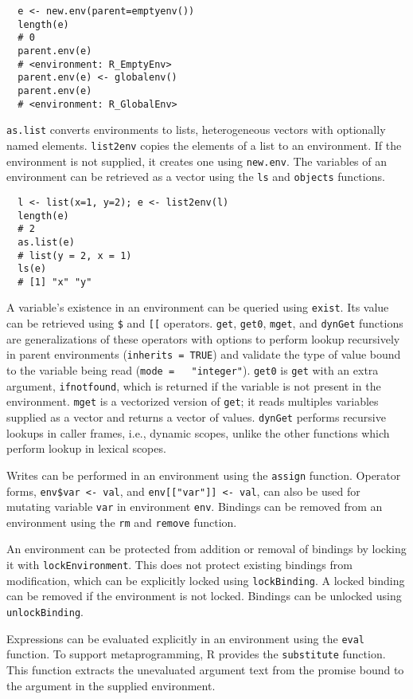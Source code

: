 \documentclass[10pt,review,sigplan,anonymous=true,authorversion=true,nonacm=true]{acmart}
\newcommand{\code}[1]{\lstinline |#1|\xspace}
\newcommand{\newEnv}{\code{new.env}}
\newcommand{\asList}{\code{as.list}}
\newcommand{\listToEnv}{\code{list2env}}
\newcommand{\ls}{\code{ls}}
\newcommand{\objects}{\code{objects}}
\newcommand{\subDollar}{\code{$}}
\newcommand{\subBracket}{\code{[[}}
\newcommand{\exist}{\code{exist}}
\newcommand{\get}{\code{get}}
\newcommand{\getZero}{\code{get0}}
\newcommand{\mget}{\code{mget}}
\newcommand{\dynGet}{\code{dynGet}}
\newcommand{\assign}{\code{assign}}
\newcommand{\remove}{\code{remove}}
\renewcommand{\rm}{\code{rm}}
\newcommand{\lockEnvironment}{\code{lockEnvironment}}
\newcommand{\lockBinding}{\code{lockBinding}}
\newcommand{\unlockBinding}{\code{unlockBinding}}
\newcommand{\eval}{\code{eval}}
\newcommand{\substitute}{\code{substitute}}
\begin{document}
\begin{lstlisting}
  e <- new.env(parent=emptyenv())
  length(e)
  # 0
  parent.env(e)
  # <environment: R_EmptyEnv>
  parent.env(e) <- globalenv()
  parent.env(e)
  # <environment: R_GlobalEnv>
\end{lstlisting}

\asList converts environments to lists, heterogeneous vectors with optionally
named elements. \listToEnv copies the elements of a list to an environment. If
the environment is not supplied, it creates one using \newEnv. The variables of
an environment can be retrieved as a vector using the \ls and \objects
functions.

\begin{lstlisting}
  l <- list(x=1, y=2); e <- list2env(l)
  length(e)
  # 2
  as.list(e)
  # list(y = 2, x = 1)
  ls(e)
  # [1] "x" "y"
\end{lstlisting}

A variable's existence in an environment can be queried using \exist. Its value
can be retrieved using \subDollar and \subBracket operators. \get, \getZero,
\mget, and \dynGet functions are generalizations of these operators with options
to perform lookup recursively in parent environments (\code{inherits = TRUE})
and validate the type of value bound to the variable being read (\code{mode =
  "integer"}). \getZero is \get with an extra argument, \code{ifnotfound}, which
is returned if the variable is not present in the environment. \mget is a
vectorized version of \get; it reads multiples variables supplied as a vector
and returns a vector of values. \dynGet performs recursive lookups in caller
frames, i.e., dynamic scopes, unlike the other functions which perform lookup in
lexical scopes.

Writes can be performed in an environment using the \assign function. Operator
forms, \code{env$var <- val}, and \code{env[["var"]] <- val}, can also be used
for mutating variable \code{var} in environment \code{env}. Bindings
can be removed from an environment using the \rm and \remove function.

An environment can be protected from addition or removal of bindings by locking
it with \lockEnvironment. This does not protect existing bindings from
modification, which can be explicitly locked using \lockBinding. A locked
binding can be removed if the environment is not locked. Bindings can be
unlocked using \unlockBinding.

Expressions can be evaluated explicitly in an environment using the \eval
function. To support metaprogramming, R provides the \substitute function. This
function extracts the unevaluated argument text from the promise bound to the
argument in the supplied environment.
\end{document}
